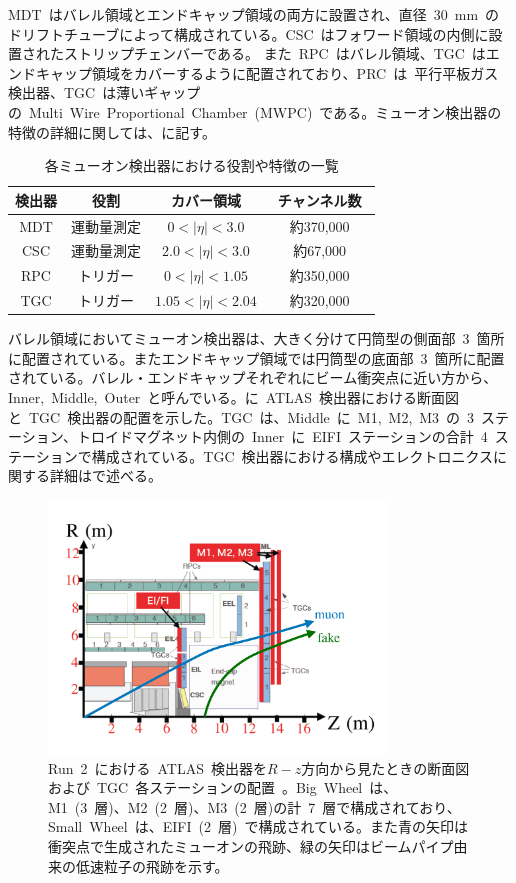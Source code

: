MDT~はバレル領域とエンドキャップ領域の両方に設置され、直径~30~mm~のドリフトチューブによって構成されている。CSC~はフォワード領域の内側に設置されたストリップチェンバーである。 また~RPC~はバレル領域、TGC~はエンドキャップ領域をカバーするように配置されており、PRC~は~平行平板ガス検出器、TGC~は薄いギャップの~Multi~Wire~Proportional~Chamber~(MWPC)~である。ミューオン検出器の特徴の詳細に関しては、に記す。
\begin{table}[tbp]
	\centering
	\begin{tabular}{c|ccc}\hline
	    検出器 & 役割 & カバー領域 & チャンネル数　\\ \hline\hline
		MDT & 運動量測定 & $0<|\eta|<3.0$ & 約370,000 \\ 
		CSC & 運動量測定 & $2.0<|\eta|<3.0$ & 約67,000 \\
        RPC & トリガー & $0<|\eta|<1.05$ & 約350,000 \\
        TGC & トリガー & $1.05<|\eta|<2.04$ & 約320,000 \\ \hline 
	\end{tabular}
	\caption{各ミューオン検出器における役割や特徴の一覧}
    \label{tb:muon}
\end{table}

バレル領域においてミューオン検出器は、大きく分けて円筒型の側面部~3~箇所に配置されている。またエンドキャップ領域では円筒型の底面部~3~箇所に配置されている。バレル・エンドキャップそれぞれにビーム衝突点に近い方から、Inner,~Middle,~Outer~と呼んでいる。に~ATLAS~検出器における断面図と~TGC~検出器の配置を示した。TGC~は、Middle~に~M1,~M2,~M3~の~3~ステーション、トロイドマグネット内側の~Inner~に~EIFI~ステーションの合計~4~ステーションで構成されている。TGC~検出器における構成やエレクトロニクスに関する詳細はで述べる。
\begin{figure}[tbp]
    \centering
    \includegraphics[width=0.8\textwidth,page=1]{img/pdf/fake.pdf}
    \caption[Run~2~における~ATLAS~検出器を$R-z$方向から見たときの断面図および~TGC~各ステーションの配置]{Run~2~における~ATLAS~検出器を$R-z$方向から見たときの断面図および~TGC~各ステーションの配置~\cite{TR:01}。Big~Wheel~は、M1~(3~層)、M2~(2~層)、M3~(2~層)の計~7~層で構成されており、Small~Wheel~は、EIFI~(2~層)~で構成されている。また青の矢印は衝突点で生成されたミューオンの飛跡、緑の矢印はビームパイプ由来の低速粒子の飛跡を示す。}\label{fig:tgc000}
\end{figure}


